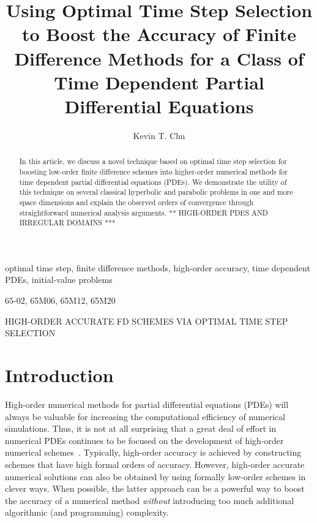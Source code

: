 \documentclass[oneeqnum,onefignum,onetabnum,onethmnum]{siamltex}
\title{Using Optimal Time Step Selection to Boost the Accuracy of
       Finite Difference Methods for a Class of 
       Time Dependent Partial Differential Equations}
\author{
Kevin T. Chu\footnotemark[2]
}
\begin{document}

\maketitle

\renewcommand{\thefootnote}{\fnsymbol{footnote}}

\renewcommand{\thefootnote}{\arabic{footnote}}


\begin{abstract}
In this article, we discuss a novel technique based on optimal time step 
selection for boosting low-order finite difference schemes
into higher-order numerical methods for time dependent partial differential
equations (PDEs).  We demonstrate the utility of this technique on several 
classical hyperbolic and parabolic problems in one and more space dimensions 
and explain the observed orders of convergence through straightforward numerical
analysis arguments.
** HIGH-ORDER PDES AND IRREGULAR DOMAINS ***
\end{abstract}


\begin{keywords}
optimal time step, finite difference methods, high-order accuracy, 
time dependent PDEs, initial-value problems
\end{keywords}

\begin{AMS}
65-02, 65M06, 65M12, 65M20
\end{AMS}

\pagestyle{myheadings}
\thispagestyle{plain}
         {HIGH-ORDER ACCURATE FD SCHEMES VIA OPTIMAL TIME STEP SELECTION} 


\section*{Introduction}
High-order numerical methods for partial differential equations (PDEs) will 
always be valuable for increasing the computational efficiency of numerical 
simulations.  Thus, it is not at all surprising that a great deal of effort in 
numerical PDEs continues to be focused on the development of high-order 
numerical schemes~\cite{gibour_2005,??}.  
Typically, high-order accuracy is achieved by constructing
schemes that have high formal orders of accuracy.  However, high-order 
accurate numerical solutions can also be obtained by using formally low-order 
schemes in clever ways.  When possible, the latter approach can be a powerful 
way to boost the accuracy of a numerical method \emph{without} introducing too 
much additional algorithmic (and programming) complexity.
\end{document}
